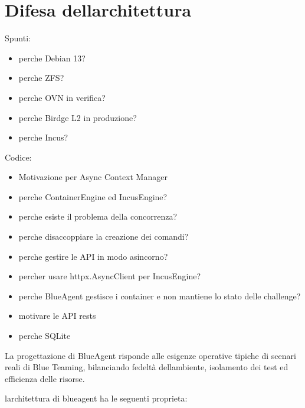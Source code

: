 \section{Difesa
dell\textquotesingle architettura}\label{difesa-dellarchitettura}

Spunti:

\begin{itemize}
\tightlist
\item
  perche\textquotesingle{} Debian 13?
\item
  perche\textquotesingle{} ZFS?
\item
  perche\textquotesingle{} OVN in verifica?
\item
  perche\textquotesingle{} Birdge L2 in produzione?
\item
  perche\textquotesingle{} Incus?
\end{itemize}

Codice:

\begin{itemize}
\tightlist
\item
  Motivazione per Async Context Manager
\item
  perche ContainerEngine ed IncusEngine?
\item
  perche esiste il problema della concorrenza?
\item
  perche disaccoppiare la creazione dei comandi?
\item
  perche gestire le API in modo asincorno?
\item
  percher usare httpx.AsyncClient per IncusEngine?
\item
  perche BlueAgent gestisce i container e non mantiene lo stato delle
  challenge?
\item
  motivare le API rests
\item
  perche SQLite
\end{itemize}

La progettazione di BlueAgent risponde alle esigenze operative tipiche
di scenari reali di Blue Teaming, bilanciando fedeltà
dell\textquotesingle ambiente, isolamento dei test ed efficienza delle
risorse.

l\textquotesingle architettura di blueagent ha le seguenti proprieta:

